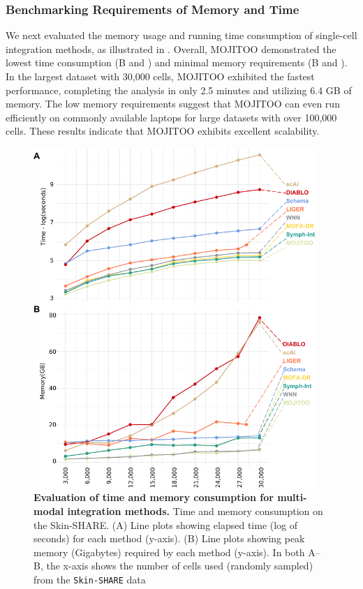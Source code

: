 \subsubsection{Benchmarking Requirements of Memory and Time}
We next evaluated the memory usage and running time consumption of single-cell integration methods, as illustrated in . Overall, MOJITOO demonstrated the lowest time consumption (B and ) and minimal memory requirements (B and ). In the largest dataset with 30,000 cells, MOJITOO exhibited the fastest performance, completing the analysis in only 2.5 minutes and utilizing 6.4 GB of memory. The low memory requirements suggest that MOJITOO can even run efficiently on commonly available laptops for large datasets with over 100,000 cells. These results indicate that MOJITOO exhibits excellent scalability.
\begin{figure}[!ht]
	\centering
	\includegraphics[width=0.95\textwidth]{time_memory/fig}
	\vspace{0.1cm}
	\caption[Evaluation of time and memory consumption for multi-modal integration methods.]{\textbf{Evaluation of time and memory consumption for multi-modal integration methods.} Time and memory consumption on the Skin-SHARE. (A) Line plots showing elapsed time (log of seconds) for each method (y-axis). (B) Line plots showing peak memory (Gigabytes) required by each method (y-axis). In both A–B, the x-axis shows the number of cells used (randomly sampled) from the \texttt{Skin-SHARE} data}
	\label{fig:time_memory}
\end{figure}

